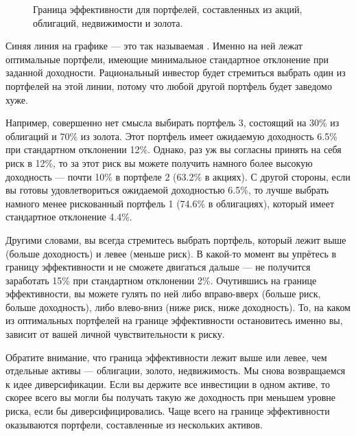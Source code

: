\begin{figure}[h!]

\caption{Граница эффективности для портфелей, составленных из акций, облигаций, недвижимости и золота.}
\label{efficient_frontier}
\end{figure}

Синяя линия на графике --- это так называемая . Именно на ней лежат оптимальные портфели, имеющие минимальное стандартное отклонение при заданной доходности. Рациональный инвестор будет стремиться выбрать один из портфелей на этой линии, потому что любой другой портфель будет заведомо хуже.

Например, совершенно нет смысла выбирать портфель 3, состоящий на 30\% из облигаций и 70\% из золота. Этот портфель имеет ожидаемую доходность 6.5\% при стандартном отклонении 12\%. Однако, раз уж вы согласны принять на себя риск в 12\%, то за этот риск вы можете получить намного более высокую доходность --- почти 10\% в портфеле 2 (63.2\% в акциях). С другой стороны, если вы готовы удовлетвориться ожидаемой доходностью 6.5\%, то лучше выбрать намного менее рискованный портфель 1 (74.6\% в облигациях), который имеет стандартное отклонение 4.4\%.

Другими словами, вы всегда стремитесь выбрать портфель, который лежит выше (больше доходность) и левее (меньше риск). В какой-то момент вы упрётесь в границу эффективности и не сможете двигаться дальше --- не получится заработать 15\% при стандартном отклонении 2\%. Очутившись на границе эффективности, вы можете гулять по ней либо вправо-вверх (больше риск, больше доходность), либо влево-вниз (ниже риск, ниже доходность). То, на каком из оптимальных портфелей на границе эффективности остановитесь именно вы, зависит от вашей личной чувствительности к риску.

Обратите внимание, что граница эффективности лежит выше или левее, чем отдельные активы --- облигации, золото, недвижимость. Мы снова возвращаемся к идее диверсификации. Если вы держите все инвестиции в одном активе, то скорее всего вы могли бы получать такую же доходность при меньшем уровне риска, если бы диверсифицировались. Чаще всего на границе эффективности оказываются портфели, составленные из нескольких активов.

